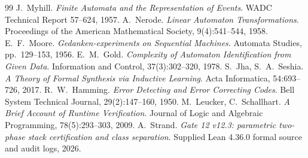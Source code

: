 \documentclass[11pt,a4paper]{article}
\begin{document}
\begin{thebibliography}{99}\setlength{\itemsep}{1pt}
 J.~Myhill. \emph{Finite Automata and the Representation of Events}. WADC Technical Report 57--624, 1957.
 A.~Nerode. \emph{Linear Automaton Transformations}. Proceedings of the American Mathematical Society, 9(4):541--544, 1958.
 E.~F.~Moore. \emph{Gedanken-experiments on Sequential Machines}. Automata Studies, pp.~129--153, 1956.
 E.~M.~Gold. \emph{Complexity of Automaton Identification from Given Data}. Information and Control, 37(3):302--320, 1978.
 S.~Jha, S.~A.~Seshia. \emph{A Theory of Formal Synthesis via Inductive Learning}. Acta Informatica, 54:693--726, 2017.
 R.~W.~Hamming. \emph{Error Detecting and Error Correcting Codes}. Bell System Technical Journal, 29(2):147--160, 1950.
 M.~Leucker, C.~Schallhart. \emph{A Brief Account of Runtime Verification}. Journal of Logic and Algebraic Programming, 78(5):293--303, 2009.
 A.~Strand. \emph{Gate 12 v12.3: parametric two-phase stack certification and class separation}. Supplied Lean 4.36.0 formal source and audit logs, 2026.
\end{thebibliography}
\end{document}
